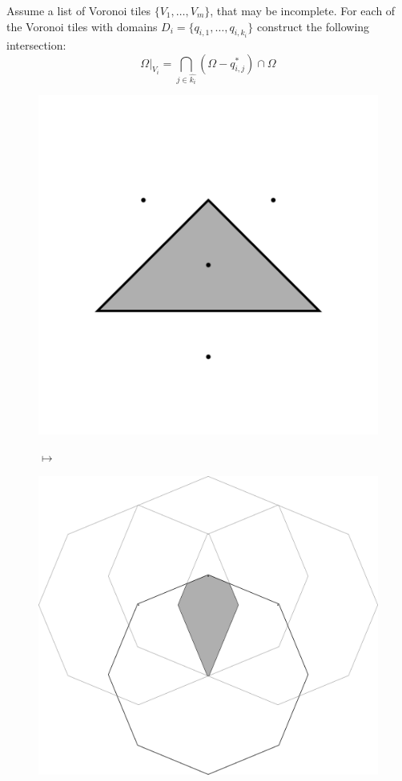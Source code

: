 \documentclass[text.tex]{subfiles}
\begin{document}
Assume a list of Voronoi tiles $\{V_1,\dots,V_m\}$, that may be incomplete. For each of the Voronoi tiles with domains $D_i = \{q_{i,1},\dots,q_{i,k_i}\}$ construct the following intersection: 
$$\Omega|_{V_i} = \bigcap\limits_{j\in\hat{k_i}}(\Omega-q_{i,j}^\ast)\cap\Omega$$

\begin{figure}[h!]
\centering
\begin{minipage}{0.25\textwidth}
\includegraphics[width=\textwidth]{img/2D/intersectionTile01}
\end{minipage}
\qquad$\longmapsto$\qquad
\begin{minipage}{0.4\textwidth}
\includegraphics[width=\textwidth]{img/2D/intersection01}

\end{minipage}
\end{figure}
\end{document}
